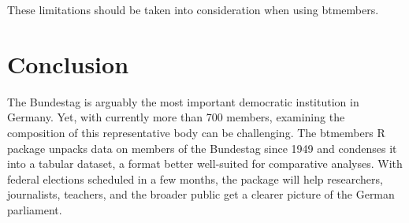 \documentclass[12pt]{article}
\begin{document}
These limitations should be taken into consideration when using
btmembers.

\hypertarget{conclusion}{%
\section{Conclusion}\label{conclusion}}

The Bundestag is arguably the most important democratic institution in
Germany. Yet, with currently more than 700 members, examining the
composition of this representative body can be challenging. The
btmembers R package unpacks data on members of the Bundestag since 1949
and condenses it into a tabular dataset, a format better well-suited for
comparative analyses. With federal elections scheduled in a few months,
the package will help researchers, journalists, teachers, and the
broader public get a clearer picture of the German parliament.



\end{document}
